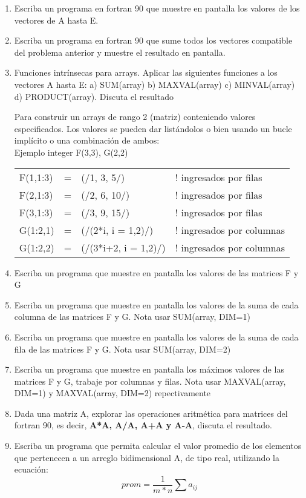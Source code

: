 \documentclass[11pt]{exam}
\begin{document}
\begin{enumerate}
 \item 
Escriba un programa en  fortran 90 que muestre en pantalla los valores de los vectores de A hasta E.
\item 
Escriba un programa en  fortran 90 que sume todos los vectores compatible del problema anterior y muestre el resultado en pantalla.
\item 
Funciones intr\'insecas para arrays. Aplicar las siguientes funciones a los vectores A hasta E:  a) SUM(array) b) MAXVAL(array) c) MINVAL(array) d) PRODUCT(array). Discuta el resultado 

Para  construir un arrays de rango 2 (matriz) conteniendo valores especificados. Los valores se pueden dar list\'andolos o bien usando un bucle impl\'icito o una combinaci\'on de ambos:\\
Ejemplo  integer F(3,3), G(2,2)

\begin{tabular}{llll}
F(1,1:3)& =& (/1, 3, 5/)    	&! ingresados por filas\\
F(2,1:3)& = &(/2, 6, 10/) 	&! ingresados por filas\\
F(3,1:3)& = &(/3, 9, 15/)	&! ingresados por filas\\
G(1:2,1)& = &(/(2*i, i = 1,2)/)  &! ingresados por columnas\\
G(1:2,2)& = &(/(3*i+2, i = 1,2)/)&! ingresados por columnas\\
\end{tabular}
\item 
Escriba un programa que muestre en pantalla los valores de las matrices F y G
\item 
Escriba un programa que muestre en pantalla los valores de la suma de cada columna de las matrices F y G. Nota usar SUM(array, DIM=1)
\item 
Escriba un programa que muestre en pantalla los valores de la suma de cada fila de las matrices F y G. Nota usar SUM(array, DIM=2)
\item 
Escriba un programa que muestre en pantalla los m\'aximos valores de las matrices F y G, trabaje por columnas y filas. Nota usar MAXVAL(array, DIM=1) y MAXVAL(array, DIM=2) repectivamente
\item 
Dada una matriz A, explorar las operaciones aritm\'etica para matrices del fortran 90, es decir, \textbf{A*A, A/A, A+A y A-A}, discuta el resultado.
\item 
Escriba un programa     que permita calcular el valor promedio de los elementos que pertenecen a un arreglo bidimensional A, de tipo real, utilizando la ecuaci\'on:
$$prom=\dfrac{1}{m*n}\sum a_{ij}$$
\\
\end{enumerate}
\end{document}

